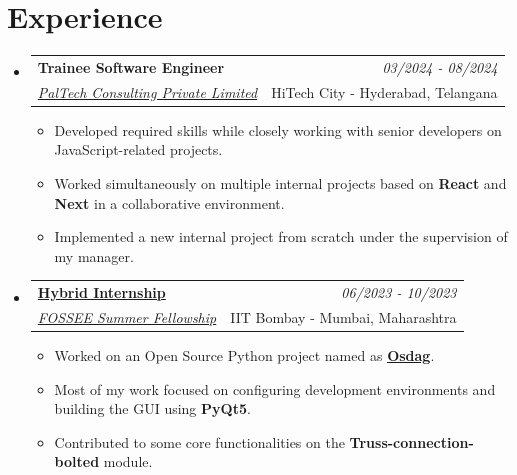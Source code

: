 \documentclass[a4paper,11pt]{article}
\makeatletter
\newcommand{\resumeSubheading}[4]{
\vspace{0.5mm}\item
    \begin{tabular*}{0.98\textwidth}[t]{l@{\extracolsep{\fill}}r}
        \textbf{#1} & \textit{\footnotesize{#4}} \\
        \textit{\footnotesize{#3}} &  \footnotesize{#2}\\
    \end{tabular*}
    \vspace{-2.4mm}
}
\newcommand{\resumeSubHeadingListStart}{\begin{itemize}[leftmargin=*,labelsep=0mm]}
\newcommand{\resumeItemListStart}{\begin{justify}\begin{itemize}[leftmargin=3ex, rightmargin=2ex, noitemsep,labelsep=1.2mm,itemsep=0mm]\small}
\newcommand{\resumeSubHeadingListEnd}{\end{itemize}\vspace{2mm}}
\newcommand{\resumeItemListEnd}{\end{itemize}\end{justify}\vspace{-2mm}}
\makeatother
\begin{document}
\section{\textbf{Experience}}
  \resumeSubHeadingListStart
    \resumeSubheading
      {Trainee Software Engineer}{HiTech City - Hyderabad, Telangana}
      {\href{https://pal.tech/}{PalTech Consulting Private Limited}}{03/2024 - 08/2024}
      \vspace{-0.15mm}
      \resumeItemListStart
    \item {Developed required skills while closely working with senior developers on JavaScript-related projects.}
    \item {Worked simultaneously on multiple internal projects based on \textbf{React} and \textbf{Next} in a collaborative environment.}
    \item {Implemented a new internal project from scratch under the supervision of my manager.}
    \resumeItemListEnd
  \resumeSubHeadingListEnd
  \vspace{-5.5mm}
  \resumeSubHeadingListStart
    \resumeSubheading
      {\href{https://github.com/iamwatchdogs/Osdag/wiki\#my-report}{Hybrid Internship}}{IIT Bombay - Mumbai, Maharashtra}
      {\href{https://fossee.in/}{FOSSEE Summer Fellowship}}{06/2023 - 10/2023}
      \vspace{-0.15mm}
      \resumeItemListStart
    \item {Worked on an Open Source Python project named as \textbf{\href{https://osdag.fossee.in/}{Osdag}}.}
    \item {Most of my work focused on configuring development environments and building the GUI using \textbf{PyQt5}.}
    \item {Contributed to some core functionalities on the \textbf{Truss-connection-bolted} module.}
    \resumeItemListEnd
  \resumeSubHeadingListEnd
\vspace{-7mm}



\end{document}
